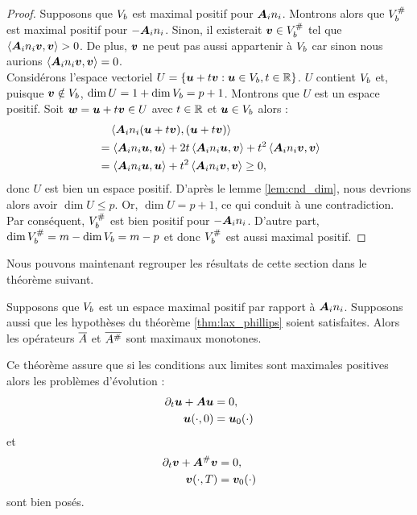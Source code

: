 \begin{proof}
	Supposons que $V_b$ est maximal positif pour ${\bm{A}_{i}n_{i}}$.
	Montrons alors que $V_b^{\#}$ est maximal positif
	pour $-{\bm{A}_{i}n_{i}}$.
	Sinon, il existerait $\bm{v} \in V_b^{\#}$
	tel que $\left\langle {\bm{A}_{i}n_{i}} \bm{v} , \bm{v} \right\rangle > 0$.
	De plus, $\bm{v}$ ne peut pas aussi appartenir à $V_b$
	car sinon nous aurions $\left\langle {\bm{A}_{i}n_{i}} \bm{v} , \bm{v} \right\rangle = 0$.
	\\
	Considérons l'espace vectoriel $U = \lbrace \bm{u} + t \bm{v} :
	\bm{u} \in V_b , t \in \mathbb{R} \rbrace$.
	$U$ contient $V_b$ et, puisque $\bm{v} \notin V_b$,
	$\dim U = 1 + \dim V_b = p + 1$.
	Montrons que $U$ est un espace positif.
	Soit $\bm{w} = \bm{u} + t \bm{v} \in U$
	avec $t \in \mathbb{R}$ et $\bm{u} \in V_b$
	alors :
	\begin{equation}
		\begin{aligned}
			&\quad \left\langle {\bm{A}_{i}n_{i}} (\bm{u} + t \bm{v}) , (\bm{u} + t \bm{v}) \right\rangle \\ &=
			\left\langle {\bm{A}_{i}n_{i}} \bm{u} , \bm{u} \right\rangle +
			2 t \left\langle {\bm{A}_{i}n_{i}} \bm{u} , \bm{v} \right\rangle +
			t^2 \left\langle {\bm{A}_{i}n_{i}} \bm{v} , \bm{v} \right\rangle \\ &=
			\left\langle {\bm{A}_{i}n_{i}} \bm{u} , \bm{u} \right\rangle +
			t^2 \left\langle {\bm{A}_{i}n_{i}} \bm{v} , \bm{v} \right\rangle \ge 0 ,
		\end{aligned}
	\end{equation}
	donc $U$ est bien un espace positif.
	D'après le lemme \ref{lem:cnd_dim}, nous devrions alors avoir
	$\dim U \le p$. Or, $\dim U = p+1$, ce qui conduit à une contradiction.
	Par conséquent, $V_b^{\#}$ est bien positif pour $-{\bm{A}_{i}n_{i}}$.
	D'autre part, $\dim V_b^{\#} = m - \dim V_b = m - p$
	et donc $V_b^{\#}$ est aussi maximal positif.
\end{proof}

Nous pouvons maintenant regrouper les résultats de cette section dans le théorème suivant.

\begin{theorem}
	Supposons que $V_b$ est un espace maximal positif par rapport à ${\bm{A}_{i}n_{i}}$.
	Supposons aussi que les hypothèses du théorème \ref{thm:lax_phillips} soient satisfaites.
	Alors les opérateurs $\overline{A}$ et $\overline{A^{\#}}$ sont maximaux monotones.
\end{theorem}

Ce théorème assure que si les conditions aux limites sont maximales positives alors les problèmes d'évolution :
\begin{subequations}
	\begin{align}
		\partial_{t} \bm{u} + \bm{A} \bm{u} &= 0, \\
		\bm{u}(\cdot,0) &= \bm{u}_0(\cdot)
	\end{align}
\end{subequations}
et
\begin{subequations}
	\begin{align}
		\partial_{t} \bm{v} + \bm{A}^{\#} \bm{v} &= 0, \\
		\bm{v}(\cdot,T) &= \bm{v}_0(\cdot)
	\end{align}
\end{subequations}
sont bien posés.

